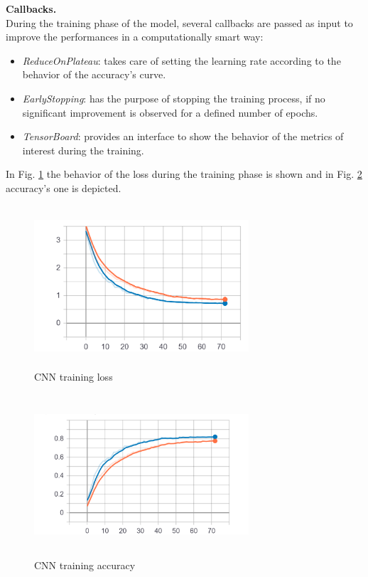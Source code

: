 \noindent \textbf{Callbacks.}\\ During the training phase of the model, several callbacks are passed as input to improve the performances in a computationally smart way:
\begin{itemize}
\item {\it{ReduceOnPlateau}}: takes care of setting the learning rate according to the behavior of the accuracy's curve.
\item {\it{EarlyStopping}}: has the purpose of stopping the training process, if no significant improvement is observed for a defined number of epochs.
\item {\it{TensorBoard}}: provides an interface to show the behavior of the metrics of interest during the training.
\end{itemize}

\noindent In Fig. \ref{fig:CNN_loss} the behavior of the loss during the training phase is shown and in Fig.  \ref{fig:CNN_accuracy} accuracy's one is depicted.
\begin{figure}[h]
			\centering
	    	\includegraphics[width=8cm, height=6cm]{debug_tuy_loss}
	    	\caption{CNN training loss}
	    	\label{fig:CNN_loss}
\end{figure} 

\begin{figure}[h]
			\centering
	    	\includegraphics[width=8cm, height=6cm]{debug_tuy_acc}
	    	\caption{CNN training accuracy}
	    	\label{fig:CNN_accuracy}
\end{figure} 




